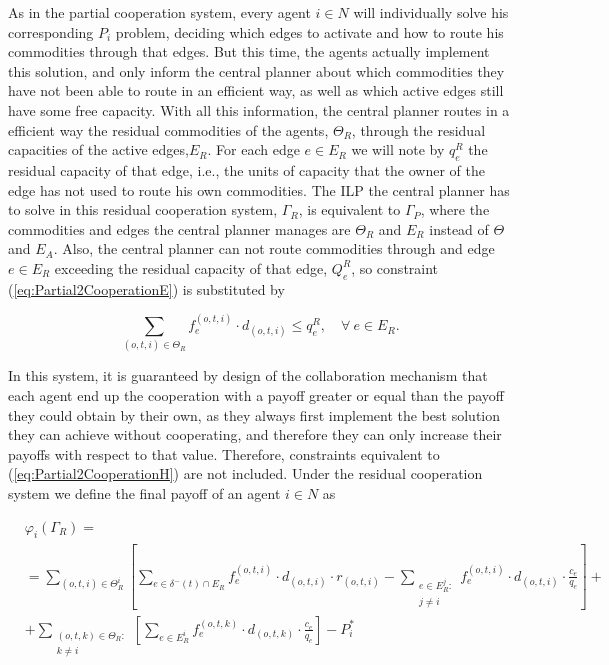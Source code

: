 \documentclass[review]{elsarticle}
\begin{document}
As in the partial cooperation system, every agent $i\in N$ will individually solve his corresponding $P_i$ problem, deciding which edges to activate and how to route his commodities through that edges. But this time, the agents actually implement this solution, and only inform the central planner about which commodities they have not been able to route in an efficient way, as well as which active edges still have some free capacity. With all this information, the central planner routes in a efficient way the residual commodities of the agents, $\Theta_R$, through the residual capacities of the active edges,$E_R$. For each edge $e \in E_R$ we will note by $q_e^R$ the residual capacity of that edge, i.e., the units of capacity that the owner of the edge has not used to route his own commodities. The ILP the central planner has to solve in this residual cooperation system, $\Gamma_R$, is equivalent to $\Gamma_P$, where the commodities and edges the central planner manages are $\Theta_R$ and $E_R$ instead of $\Theta$ and $E_A$. Also, the central planner can not route commodities through and edge $e\in E_R$ exceeding the residual capacity of that edge, $Q_e^R$, so constraint (\ref{eq:Partial2CooperationE}) is substituted by

\begin{equation}
\sum_{(o,t,i) \in \Theta_R} f_e^{(o,t,i)}\cdot d_{(o,t,i)} \leq q_e^R,\quad \forall\ e \in E_R.
\end{equation}

    
In this system, it is guaranteed by design of the collaboration mechanism that each agent end up the cooperation with a payoff greater or equal than the payoff they could obtain by their own, as they always first implement the best solution they can achieve without cooperating, and therefore they can only increase their payoffs with respect to that value. Therefore, constraints equivalent to (\ref{eq:Partial2CooperationH}) are not included. Under the residual cooperation system we define the final payoff of an agent $i\in N$ as

\begin{equation}
    \begin{split}
    & \varphi_i(\Gamma_R) =\label{eq:ResidualCooperationPayoff} \\
    & = \sum_{(o,t,i)\in \Theta^i_R} \left[ \sum_{e \in \delta^-(t)\cap E_R} f_e^{(o,t,i)} \cdot d_{(o,t,i)} \cdot r_{(o,t,i)} -  \sum_{\substack{e\in E^j_R \colon\\ j\not = i}} f_e^{(o,t,i)} \cdot d_{(o,t,i)} \cdot \frac{c_e}{q_e} \right] + \\
    & + \sum_{\substack{(o,t,k) \in \Theta_R  \colon \\ k \not = i}} \left[\sum_{e \in E_R^i} f_e^{(o,t,k)} \cdot d_{(o,t,k)} \cdot \frac{c_e}{q_e}\right] - P_i^*
    \end{split}
\end{equation}
\end{document}
